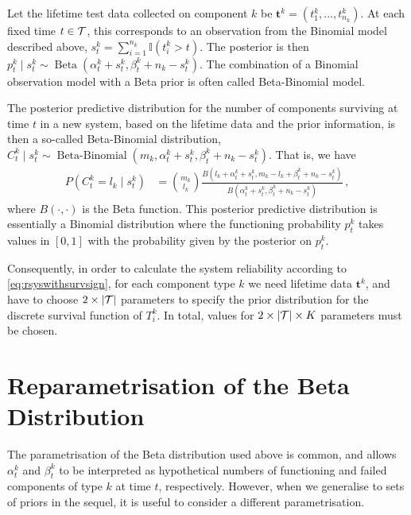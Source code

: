 \documentclass[12pt, a4paper]{elsarticle}
\newcommand{\bs}[1]{\boldsymbol{#1}}
\renewcommand{\vec}[1]{{\bs#1}}
\newcommand{\indic}{\mathbb{I}}
\newcommand{\be}{\operatorname{Beta}}
\newcommand{\bebin}{\operatorname{Beta-Binomial}}
\newcommand{\ptk}{p^k_t}
\begin{document}
Let the lifetime test data collected on component $k$ be $\vec{t}^k = (t^k_1, \ldots, t^k_{n_k})$.
At each fixed time $t \in {\cal T}$, this corresponds to an observation from the Binomial model described above,
$s^k_t = \sum_{i=1}^{n_k} \indic(t^k_i > t)$.
The posterior is then $\ptk \mid s^k_t \sim \be(\alpha^k_t + s^k_t, \beta^k_t + n_k - s^k_t)$.
The combination of a Binomial observation model with a Beta prior is often called Beta-Binomial model.

The posterior predictive distribution for the number of components surviving at time $t$
in a new system, based on the lifetime data and the prior information,
is then a so-called Beta-Binomial distribution,
$C^k_t \mid s^k_t \sim \bebin(m_k, \alpha^k_t + s^k_t, \beta^k_t + n_k - s^k_t)$.
That is, we have
\begin{align*}
P(C^k_t = l_k \mid s^k_t) &= {m_k \choose l_k} \frac{B(l_k + \alpha^k_t + s^k_t, m_k - l_k + \beta^k_t + n_k - s^k_t)}
                                                    {B(\alpha^k_t + s^k_t, \beta^k_t + n_k - s^k_t)} \,,
\end{align*}
where $B(\cdot, \cdot)$ is the Beta function.
This posterior predictive distribution is essentially a Binomial distribution
where the functioning probability $\ptk$ takes values in $[0,1]$
with the probability given by the posterior on $\ptk$.

Consequently, in order to calculate the system reliability according to \eqref{eq:rsyswithsurvsign},
for each component type $k$
we need lifetime data $\vec{t}^k$,
and have to choose $2 \times |{\cal T}|$ parameters
to specify the prior distribution for the discrete survival function of $T^k_i$.
In total, values for $2 \times |{\cal T}| \times K$ parameters must be chosen.


\section{Reparametrisation of the Beta Distribution}
\label{sec:reparam}

The parametrisation of the Beta distribution used above is common,
and allows $\alpha^k_t$ and $\beta^k_t$ to be interpreted as
hypothetical numbers of functioning and failed components of type $k$ at time $t$, respectively.
However, when we generalise to sets of priors in the sequel,
it is useful to consider a different parametrisation.
\end{document}

